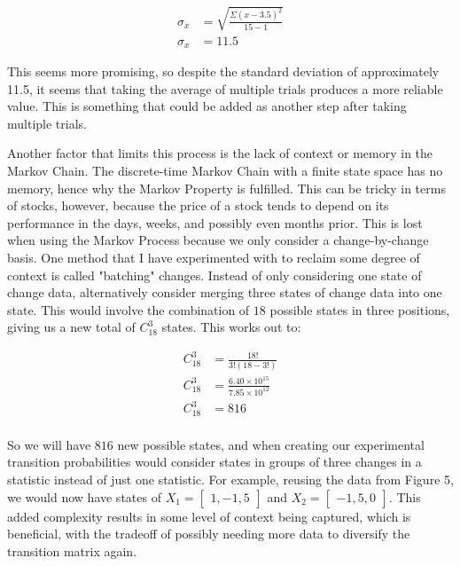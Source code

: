 \documentclass[12pt,final]{article}
\begin{document}
\begin{subequations}
\begin{align}
	\sigma_x &= \sqrt{\frac{\Sigma(x-3.5)^2}{15-1}} \\
 	\sigma_x &= 11.5
\end{align}
	\label{eq:stddeviationofchangeinclosetrials}
\end{subequations}

This seems more promising, so despite the standard deviation of approximately 11.5, it seems that taking the 
average of multiple trials produces a more reliable value. This is something that could be added as another
step after taking multiple trials. 

Another factor that limits this process is the lack of context or memory in the Markov Chain. The discrete-time
Markov Chain with a finite state space has no memory, hence why the Markov Property is fulfilled. This can be
tricky in terms of stocks, however, because the price of a stock tends to depend on its performance in the days,
weeks, and possibly even months prior. This is lost when using the Markov Process because we only consider a
change-by-change basis. One method that I have experimented with to reclaim some degree of context is called
"batching" changes. Instead of only considering one state of change data, alternatively consider merging
three states of change data into one state. This would involve the combination of $18$ possible states in
three positions, giving us a new total of $C_{18}^3$ states. This works out to:

\begin{subequations}
\begin{align}
  C_{18}^3 &= \frac{18!}{3!(18-3!)} \\
  C_{18}^3 &= \frac{6.40\times10^{15}}{7.85\times10^{12}} \\
  C_{18}^3 &= 816 \\
\end{align}
\label{eq:18choose3combination}
\end{subequations}

So we will have $816$ new possible states, and when creating our experimental transition probabilities would
consider states in groups of three changes in a statistic instead of just one statistic. For example, reusing
the data from Figure 5, we would now have states of $X_1=\begin{bmatrix}1, -1, 5\end{bmatrix}$ and
$X_2=\begin{bmatrix}-1, 5, 0\end{bmatrix}$. This added complexity results in some level of context being
captured, which is beneficial, with the tradeoff of possibly needing more data to diversify the transition
matrix again.
\end{document}
